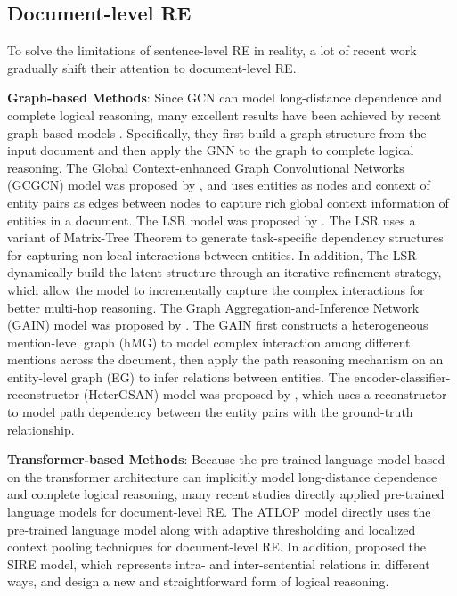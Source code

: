 \documentclass[sigconf,natbib=true]{acmart}
\begin{document}
\subsection{Document-level RE}
To solve the limitations of sentence-level RE in reality, a lot of recent work gradually shift their attention to document-level RE.

\noindent \textbf{Graph-based Methods}: 
Since GCN can model long-distance dependence and complete logical reasoning, many excellent results have been achieved by recent graph-based models \cite{c:155,c:108,c:129,c:138,c:150,c:131,c:130,c:118,c:133}.
Specifically, they first build a graph structure from the input document and then apply the GNN to the graph to complete logical reasoning. 
The Global Context-enhanced Graph Convolutional Networks (GCGCN) model was proposed by \cite{c:150}, and uses entities as nodes and context of entity pairs as edges between nodes to capture rich global context information of entities in a document.
The LSR model was proposed by \cite{c:130}. The LSR uses a variant of Matrix-Tree Theorem to generate task-specific dependency structures for capturing non-local interactions between entities. In addition, The LSR dynamically build the latent structure through an iterative refinement strategy, which allow the model to incrementally capture the complex interactions for better multi-hop reasoning.
The Graph Aggregation-and-Inference Network (GAIN) model was proposed by \cite{c:118}. The GAIN first constructs a heterogeneous mention-level graph (hMG) to model complex interaction among different mentions across the document, then apply the path reasoning mechanism on an entity-level graph (EG) to infer relations between entities.
The encoder-classifier-reconstructor (HeterGSAN) model was proposed by \cite{c:133}, which uses a reconstructor to model path dependency between the entity pairs with the ground-truth relationship.

\noindent \textbf{Transformer-based Methods}: 
Because the pre-trained language model based on the transformer architecture can implicitly model long-distance dependence and complete logical reasoning, many recent studies \cite{c:111,c:106} directly applied pre-trained language models for document-level RE. The ATLOP \cite{c:106} model directly uses the pre-trained language model along with adaptive thresholding and localized context pooling  techniques for document-level RE.
In addition, \cite{c:121} proposed the SIRE model, which represents intra- and inter-sentential relations in different ways, and design a new and straightforward form of logical reasoning.
\end{document}
